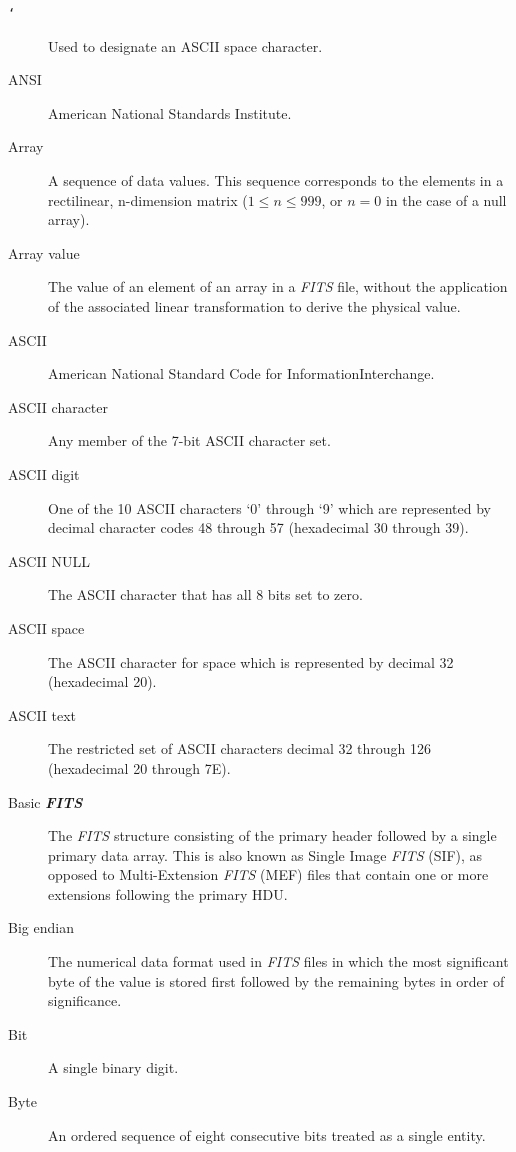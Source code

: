 \documentclass[11pt,makeidx]{book}     %
\begin{document}
\begin{description}
\item[\hbox{\tt\char`\ }] Used to designate an ASCII space character.
\item[ANSI] American National Standards
    Institute.
\item[Array]  A sequence of data values. This sequence 
     corresponds to the elements in a rectilinear, n-dimension matrix 
     ($1 \leq n \leq 999$, or $n = 0$ in the case of a null array).
\item[Array value] The value of an element of an array 
     in a {\em FITS\/} file, without the application of the 
     associated linear transformation to derive the
     physical value.
\item[ASCII] American National Standard Code 
             for Information\linebreak[1] Interchange.
\item[ASCII character] Any 
      member of the 7-bit ASCII character set. 
\item[ASCII digit] One of the 10 ASCII characters `0' through `9'
      which are represented by decimal character codes 48 through 57
      (hexadecimal 30 through 39).
\item[ASCII NULL] The ASCII character that has all 8 
      bits set to zero.
\item[ASCII space] The ASCII character for space
      which is represented by decimal 32 (hexadecimal 20).
\item[ASCII text] The restricted set of ASCII characters 
      decimal 32 through 126 (hexadecimal 20 through 7E).
\item[Basic {\em\bf FITS}] The {\em FITS\/} 
      structure consisting of
      the primary header followed by a single
      primary data array. This is also known
      as  Single Image {\em FITS\/} (SIF), as opposed to 
      Multi-Extension {\em FITS\/} (MEF) files that contain 
      one or more extensions following the primary HDU.
\item[Big endian]  The numerical data format used in {\em FITS\/} files 
in which the most significant byte of the value is stored first followed by the
remaining bytes in order of significance.
\item[Bit] A single binary digit.
\item[Byte] An ordered sequence of eight consecutive bits treated as a single entity.

\end{description}
\end{document}
